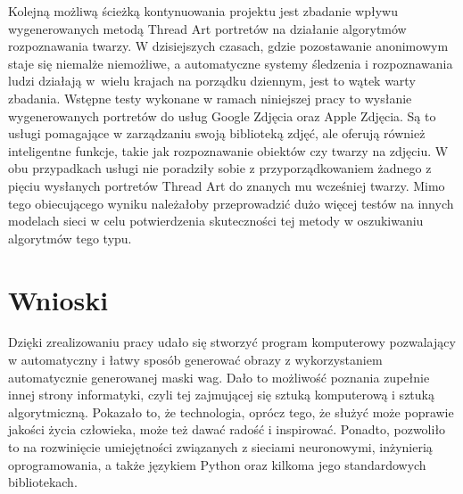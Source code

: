     Kolejną możliwą ścieżką kontynuowania projektu jest zbadanie wpływu wygenerowanych metodą Thread Art portretów na działanie algorytmów rozpoznawania twarzy. W dzisiejszych czasach, gdzie pozostawanie anonimowym staje się niemalże niemożliwe, a automatyczne systemy śledzenia i rozpoznawania ludzi działają w~wielu krajach na porządku dziennym, jest to wątek warty zbadania. Wstępne testy wykonane w ramach niniejszej pracy to wysłanie wygenerowanych portretów do usług Google Zdjęcia oraz Apple Zdjęcia. Są to usługi pomagające w zarządzaniu swoją biblioteką zdjęć, ale oferują również inteligentne funkcje, takie jak rozpoznawanie obiektów czy twarzy na zdjęciu. W obu przypadkach usługi nie poradziły sobie z przyporządkowaniem żadnego z pięciu wysłanych portretów Thread Art do znanych mu wcześniej twarzy. Mimo tego obiecującego wyniku należałoby przeprowadzić dużo więcej testów na innych modelach sieci w celu potwierdzenia skuteczności tej metody w oszukiwaniu algorytmów tego typu.
    
    \section{Wnioski}
    Dzięki zrealizowaniu pracy udało się stworzyć program komputerowy pozwalający w automatyczny i łatwy sposób generować obrazy z wykorzystaniem automatycznie generowanej maski wag. Dało to możliwość poznania zupełnie innej strony informatyki, czyli tej zajmującej się sztuką komputerową i sztuką algorytmiczną. Pokazało to, że technologia, oprócz tego, że służyć może poprawie jakości życia człowieka, może też dawać radość i inspirować. Ponadto, pozwoliło to na rozwinięcie umiejętności związanych z sieciami neuronowymi, inżynierią oprogramowania, a także językiem Python oraz kilkoma jego standardowych bibliotekach.

        
\printbibliography[heading=bibintoc,title={Bibliografia}]

\listoffigures

\listofcodes

\renewcommand{\listtablename}{Spis tabel}
\listoftables